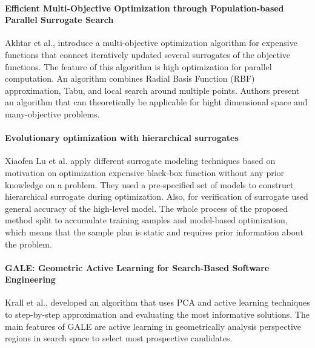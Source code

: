         \paragraph{Efficient Multi-Objective Optimization through Population-based Parallel Surrogate Search} Akhtar et al.,\cite{akhtar2019efficient} introduce a multi-objective optimization algorithm for expensive functions that connect iteratively updated several surrogates of the objective functions. The feature of this algorithm is high optimization for parallel computation. An algorithm combines Radial Basis Function (RBF) approximation, Tabu, and local search around multiple points. Authors present an algorithm that can theoretically be applicable for hight dimensional space and many-objective problems.

        \paragraph{Evolutionary optimization with hierarchical surrogates} Xiaofen Lu et al. \cite{LuST19} apply different surrogate modeling techniques based on motivation on optimization expensive black-box function without any prior knowledge on a problem. They used a pre-specified set of models to construct hierarchical surrogate during optimization. Also, for verification of surrogate used general accuracy of the high-level model. The whole process of the proposed method split to accumulate training samples and model-based optimization, which means that the sample plan is static and requires prior information about the problem.

        \paragraph{GALE: Geometric Active Learning for Search-Based Software Engineering} Krall et al.,\cite{KrallMD15} developed an algorithm that uses PCA and active learning techniques to step-by-step approximation and evaluating the most informative solutions. The main features of GALE are active learning in geometrically analysis perspective regions in search space to select most prospective candidates.

